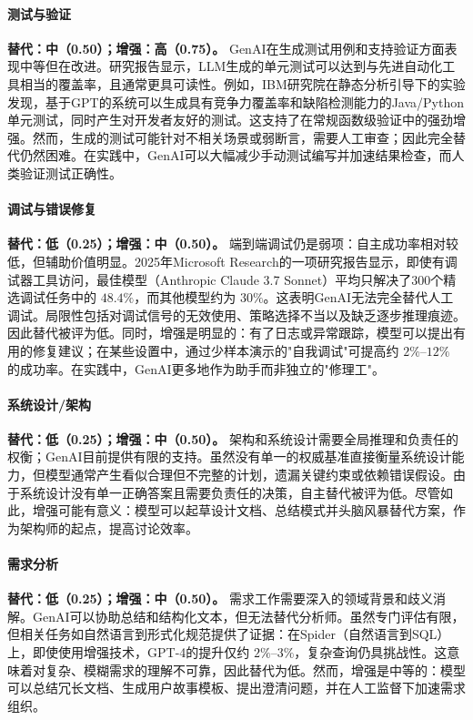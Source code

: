 \paragraph{测试与验证}
\textbf{替代：中（0.50）；增强：高（0.75）。}
GenAI在生成测试用例和支持验证方面表现中等但在改进。研究报告显示，LLM生成的单元测试可以达到与先进自动化工具相当的覆盖率，且通常更具可读性。例如，IBM研究院在静态分析引导下的实验发现，基于GPT的系统可以生成具有竞争力覆盖率和缺陷检测能力的Java/Python单元测试，同时产生对开发者友好的测试。这支持了在常规函数级验证中的强劲增强。然而，生成的测试可能针对不相关场景或弱断言，需要人工审查；因此完全替代仍然困难。在实践中，GenAI可以大幅减少手动测试编写并加速结果检查，而人类验证测试正确性。

\paragraph{调试与错误修复}
\textbf{替代：低（0.25）；增强：中（0.50）。}
端到端调试仍是弱项：自主成功率相对较低，但辅助价值明显。2025年Microsoft Research的一项研究报告显示，即使有调试器工具访问，最佳模型（Anthropic Claude 3.7 Sonnet）平均只解决了300个精选调试任务中的 $48.4\%$，而其他模型约为 $30\%$。这表明GenAI无法完全替代人工调试。局限性包括对调试信号的无效使用、策略选择不当以及缺乏逐步推理痕迹。因此替代被评为低。同时，增强是明显的：有了日志或异常跟踪，模型可以提出有用的修复建议；在某些设置中，通过少样本演示的"自我调试"可提高约 $2\%$--$12\%$ 的成功率。在实践中，GenAI更多地作为助手而非独立的"修理工"。

\paragraph{系统设计/架构}
\textbf{替代：低（0.25）；增强：中（0.50）。}
架构和系统设计需要全局推理和负责任的权衡；GenAI目前提供有限的支持。虽然没有单一的权威基准直接衡量系统设计能力，但模型通常产生看似合理但不完整的计划，遗漏关键约束或依赖错误假设。由于系统设计没有单一正确答案且需要负责任的决策，自主替代被评为低。尽管如此，增强可能有意义：模型可以起草设计文档、总结模式并头脑风暴替代方案，作为架构师的起点，提高讨论效率。

\paragraph{需求分析}
\textbf{替代：低（0.25）；增强：中（0.50）。}
需求工作需要深入的领域背景和歧义消解。GenAI可以协助总结和结构化文本，但无法替代分析师。虽然专门评估有限，但相关任务如自然语言到形式化规范提供了证据：在Spider（自然语言到SQL）上，即使使用增强技术，GPT-4的提升仅约 $2\%$--$3\%$，复杂查询仍具挑战性。这意味着对复杂、模糊需求的理解不可靠，因此替代为低。然而，增强是中等的：模型可以总结冗长文档、生成用户故事模板、提出澄清问题，并在人工监督下加速需求组织。

